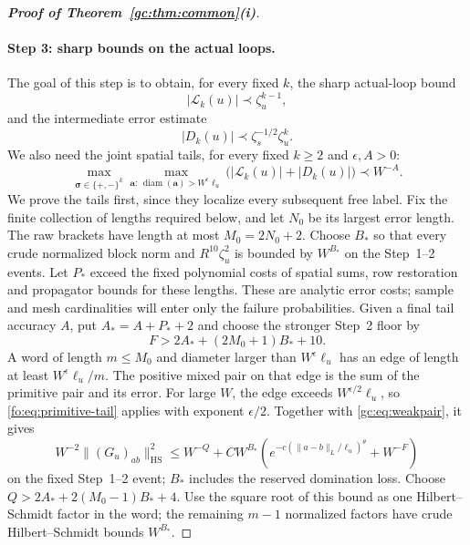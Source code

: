\documentclass[11pt]{article}
\numberwithin{equation}{section}
\theoremstyle{remark}
\newcommand{\diam}{\operatorname{diam}}
\newcommand{\cL}{\mathcal L}
\newcommand{\HS}{\mathrm{HS}}
\begin{document}
\begin{proof}[\textbf{Proof of Theorem~\ref{gc:thm:common}(i)}]
\paragraph{Step 3: sharp bounds on the actual loops.}
The goal of this step is to obtain, for every fixed $k$, the sharp
actual-loop bound
\begin{equation}\label{fo:eq:step3}
 |\cL_k(u)|\prec\zeta_u^{k-1},
\end{equation}
and the intermediate error estimate
\begin{equation}\label{fo:eq:step3-error}
 |D_k(u)|\prec\zeta_s^{-1/2}\zeta_u^k.
\end{equation}
We also need the joint spatial tails, for every fixed $k\ge2$ and
$\epsilon,A>0$:
\begin{equation}\label{fo:eq:step5-tails}
 \max_{\boldsymbol\sigma\in\{+,-\}^k}
 \max_{\boldsymbol a:\,\diam(\boldsymbol a)>W^\epsilon\ell_u}
 \bigl(|\cL_k(u)|+|D_k(u)|\bigr)\prec W^{-A}.
\end{equation}
We prove the tails first, since they localize every subsequent free label.
Fix the finite collection of lengths required below, and let $N_0$ be
its largest error length. The raw brackets have length at most
$M_0=2N_0+2$. Choose $B_*$ so that every crude normalized block norm
and $R^{10}\zeta_u^2$ is bounded by $W^{B_*}$ on the Step~1--2 events.
Let $P_*$ exceed the fixed polynomial costs of spatial sums, row
restoration and propagator bounds for these lengths. These are analytic
error costs; sample and mesh cardinalities will enter only the failure
probabilities. Given a final tail accuracy $A$, put $A_*=A+P_*+2$ and
choose the stronger Step~2 floor by
\begin{equation}\label{gc:eq:floor}
 F>2A_*+(2M_0+1)B_*+10.
\end{equation}
A word of length $m\le M_0$ and diameter larger than $W^\epsilon\ell_u$
has an edge of length at least $W^\epsilon\ell_u/m$.
The positive mixed pair on that edge is the sum of the primitive pair
and its error. For large $W$, the edge exceeds $W^{\epsilon/2}\ell_u$,
so \eqref{fo:eq:primitive-tail} applies with exponent $\epsilon/2$.
Together with \eqref{gc:eq:weakpair}, it gives
\[
 W^{-2}\|(G_u)_{ab}\|_{\HS}^2
 \le W^{-Q}+CW^{B_*}
       \left(e^{-c(\|a-b\|_L/\ell_u)^\theta}+W^{-F}\right)
\]
on the fixed Step~1--2 event; $B_*$ includes the reserved domination
loss. Choose $Q>2A_*+2(M_0-1)B_*+4$. Use the square root of this
bound as one Hilbert--Schmidt factor in the word; the remaining
$m-1$ normalized factors have crude Hilbert--Schmidt bounds $W^{B_*}$.

\end{proof}
\end{document}
